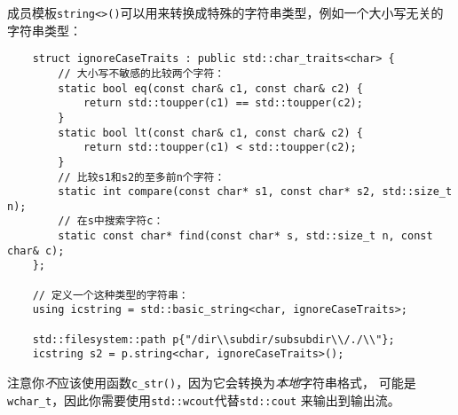 成员模板\texttt{string<>()}可以用来转换成特殊的字符串类型，例如一个大小写无关的字符串类型：
\begin{lstlisting}
    struct ignoreCaseTraits : public std::char_traits<char> {
        // 大小写不敏感的比较两个字符：
        static bool eq(const char& c1, const char& c2) {
            return std::toupper(c1) == std::toupper(c2);
        }
        static bool lt(const char& c1, const char& c2) {
            return std::toupper(c1) < std::toupper(c2);
        }
        // 比较s1和s2的至多前n个字符：
        static int compare(const char* s1, const char* s2, std::size_t n);
        // 在s中搜索字符c：
        static const char* find(const char* s, std::size_t n, const char& c);
    };

    // 定义一个这种类型的字符串：
    using icstring = std::basic_string<char, ignoreCaseTraits>;

    std::filesystem::path p{"/dir\\subdir/subsubdir\\/./\\"};
    icstring s2 = p.string<char, ignoreCaseTraits>();
\end{lstlisting}
注意你\emph{不}应该使用函数\texttt{c\_str()}，因为它会转换为\emph{本地}字符串格式，
可能是\texttt{wchar\_t}，因此你需要使用\texttt{std::wcout}代替\texttt{std::cout}
来输出到输出流。


